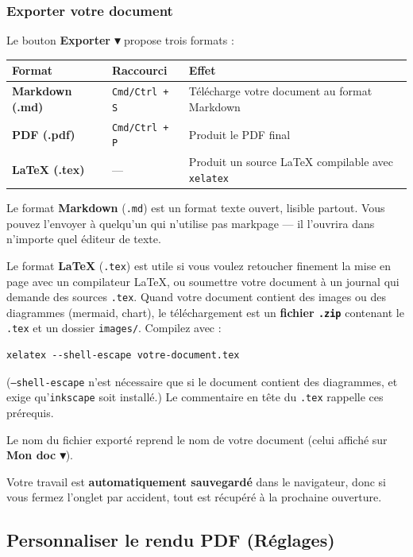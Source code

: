 \documentclass[11pt,a4paper]{article}
\theoremstyle{definition}
\begin{document}
\subsubsection{Exporter votre document}

Le bouton \textbf{Exporter ▾} propose trois formats :


\begin{tabularx}{\textwidth}{>{\raggedright\arraybackslash}X>{\raggedright\arraybackslash}X>{\raggedright\arraybackslash}X}
  \toprule
  Format & Raccourci & Effet \\
  \midrule
  \textbf{Markdown (.md)} & \texttt{Cmd/Ctrl + S} & Télécharge votre document au format Markdown \\
  \textbf{PDF (.pdf)} & \texttt{Cmd/Ctrl + P} & Produit le PDF final \\
  \textbf{LaTeX (.tex)} & — & Produit un source LaTeX compilable avec \texttt{xelatex} \\
  \bottomrule
\end{tabularx}

Le format \textbf{Markdown} (\texttt{.md}) est un format texte ouvert, lisible
partout. Vous pouvez l'envoyer à quelqu'un qui n'utilise pas markpage —
il l'ouvrira dans n'importe quel éditeur de texte.


Le format \textbf{LaTeX} (\texttt{.tex}) est utile si vous voulez retoucher
finement la mise en page avec un compilateur LaTeX, ou soumettre
votre document à un journal qui demande des sources \texttt{.tex}. Quand
votre document contient des images ou des diagrammes (mermaid,
chart), le téléchargement est un \textbf{fichier \texttt{.zip}} contenant le
\texttt{.tex} et un dossier \texttt{images/}. Compilez avec :


\begin{lstlisting}
xelatex --shell-escape votre-document.tex
\end{lstlisting}


(\texttt{--shell-escape} n'est nécessaire que si le document contient des
diagrammes, et exige qu'\texttt{inkscape} soit installé.) Le commentaire
en tête du \texttt{.tex} rappelle ces prérequis.


Le nom du fichier exporté reprend le nom de votre document (celui
affiché sur \textbf{Mon doc ▾}).


Votre travail est \textbf{automatiquement sauvegardé} dans le navigateur,
donc si vous fermez l'onglet par accident, tout est récupéré à la
prochaine ouverture.


\subsection{Personnaliser le rendu PDF (Réglages)}
\end{document}
